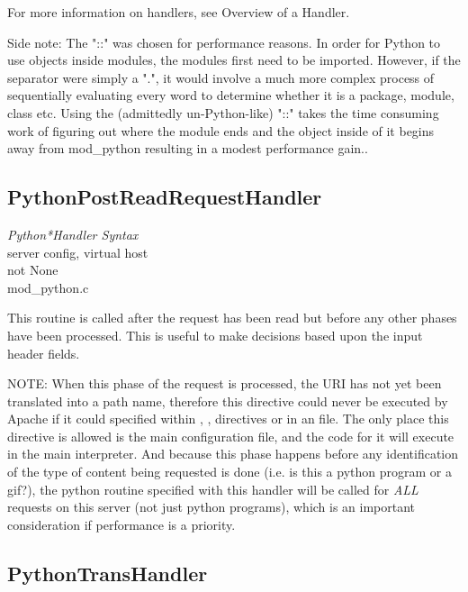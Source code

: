 For more information on handlers, see Overview of a Handler.

Side note: The "::" was chosen for performance reasons. In order for
Python to use objects inside modules, the modules first need to be
imported. However, if the separator were simply a ".", it would
involve a much more complex process of sequentially evaluating every
word to determine whether it is a package, module, class etc. Using
the (admittedly un-Python-like) "::" takes the time consuming work of
figuring out where the module ends and the object inside of it begins
away from mod_python resulting in a modest performance gain..

\subsection{PythonPostReadRequestHandler\label{dir-handlers-prrh}}

\emph{Python*Handler Syntax}\\
server config, virtual host\\
not None\\
mod_python.c

This routine is called after the request has been read but before any
other phases have been processed. This is useful to make decisions
based upon the input header fields.

NOTE: When this phase of the request is processed, the URI has not yet
been translated into a path name, therefore this directive could never
be executed by Apache if it could specified within ,
,  directives or in an 
file. The only place this directive is allowed is the main
configuration file, and the code for it will execute in the main
interpreter. And because this phase happens before any identification
of the type of content being requested is done (i.e. is this a python
program or a gif?), the python routine specified with this handler
will be called for \emph{ALL} requests on this server (not just python
programs), which is an important consideration if performance is a
priority.

\subsection{PythonTransHandler\label{dir-handlers-th}}

